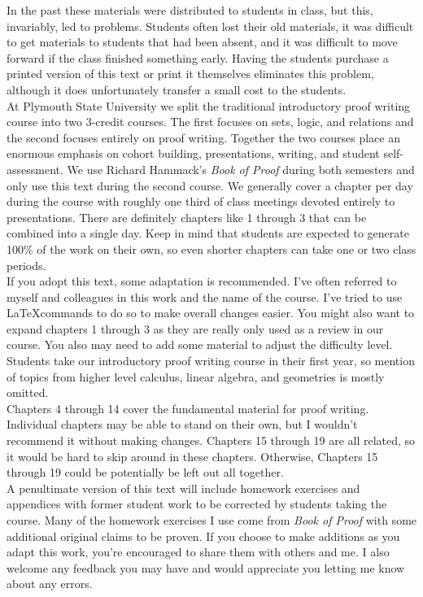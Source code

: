 In the past these materials were distributed to students in class, but this, invariably, led to problems.  Students often lost their old materials, it was difficult to get materials to students that had been absent, and it was difficult to move forward if the class finished something early.  Having the students purchase a printed version of this text or print it themselves eliminates this problem, although it does unfortunately transfer a small cost to the students. \\  

At Plymouth State University we split the traditional introductory proof writing course into two 3-credit courses.  The first focuses on sets, logic, and relations and the second focuses entirely on proof writing.  Together the two courses place an enormous emphasis on cohort building, presentations, writing, and student self-assessment.  We use Richard Hammack's \textit{Book of Proof} during both semesters and only use this text during the second course.  We generally cover a chapter per day during the course with roughly one third of class meetings devoted entirely to presentations. There are definitely chapters like 1 through 3 that can be combined into a single day.  Keep in mind that students are expected to generate 100\% of the work on their own, so even shorter chapters can take one or two class periods.\\

If you adopt this text, some adaptation is recommended.  I've often referred to myself and colleagues in this work and the name of the course.  I've tried to use \LaTeX commands to do so to make overall changes easier.  You might also want to expand chapters 1 through 3 as they are really only used as a review in our course.  You also may need to add some material to adjust the difficulty level.  Students take our introductory proof writing course in their first year, so mention of topics from higher level calculus, linear algebra, and geometries is mostly omitted.\\

Chapters 4 through 14 cover the fundamental material for proof writing.  Individual chapters may be able to stand on their own, but I wouldn't recommend it without making changes.  Chapters 15 through 19 are all related, so it would be hard to skip around in these chapters.  Otherwise, Chapters 15 through 19 could be potentially be left out all together.\\

A penultimate version of this text will include homework exercises and appendices with former student work to be corrected by students taking the course.  Many of the homework exercises I use come from \textit{Book of Proof} with some additional original claims to be proven.  If you choose to make additions as you adapt this work, you're encouraged to share them with others and me.  I also welcome any feedback you may have and would appreciate you letting me know about any errors.\\




